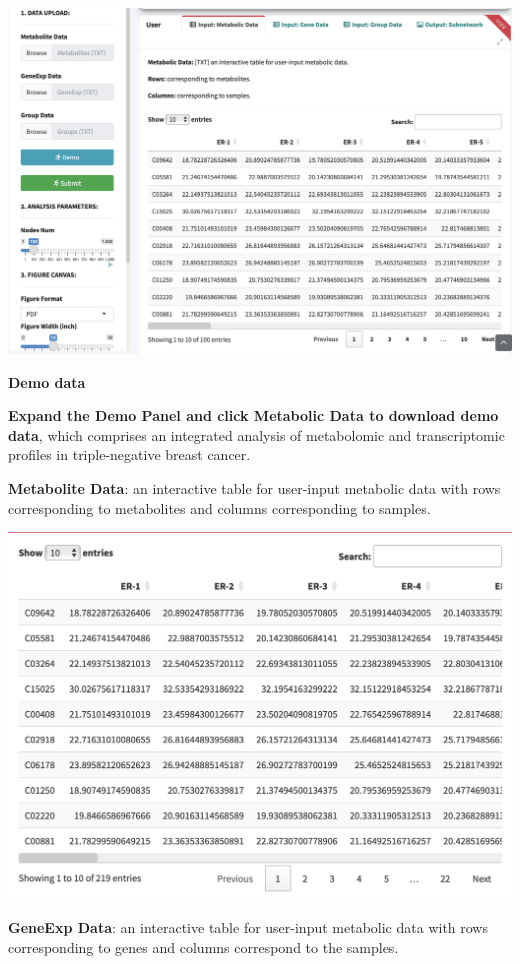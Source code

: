\documentclass[
]{book}
\begin{document}
\begin{center}\includegraphics[width=33.5in]{figure/1.M-G} \end{center}

\textbf{Demo data}

\textbf{Expand the Demo Panel and click Metabolic Data to download demo data}, which comprises an integrated analysis of metabolomic and transcriptomic profiles in triple-negative breast cancer.

\textbf{Metabolite Data}: an interactive table for user-input metabolic data with rows corresponding to metabolites and columns corresponding to samples.

\includegraphics[width=22.64in]{figure/Metabolite}

\textbf{GeneExp Data}: an interactive table for user-input metabolic data with rows corresponding to genes and columns correspond to the samples.
\end{document}
